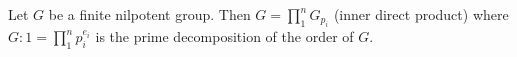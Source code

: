 Let $G$ be a finite nilpotent group. Then $G = \prod_1^n G_{p_i}$ (inner direct product) where $G:1 = \prod_1^n p_i^{e_i}$ is the prime decomposition of the order of $G$.
